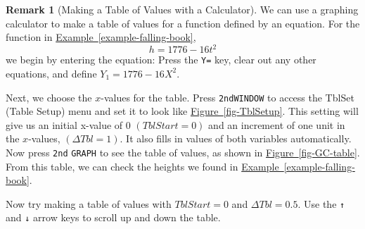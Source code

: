 \documentclass[10pt,]{book}
\theoremstyle{plain}
\theoremstyle{definition}
\newtheorem{remark}[theorem]{Remark}
\theoremstyle{definition}
\theoremstyle{definition}
\newlength{\panelmax}
\begin{document}
\begin{remark}[Making a Table of Values with a Calculator]\label{remark-1}
We can use a graphing calculator to make a table of values for a function defined by an equation. For the function in \hyperref[example-falling-book]{Example~\ref{example-falling-book}},%
\begin{equation*}
h = 1776 - 16t^2
\end{equation*}
we begin by entering the equation: Press the \lstinline?Y=? key, clear out any other equations, and define \(Y_1 = 1776 - 16X^2.\)%
\par
Next, we choose the \(x\)-values for the table. Press \lstinline?2nd?\lstinline?WINDOW? to access the TblSet (Table Setup) menu and set it to look like \hyperref[fig-TblSetup]{Figure~\ref{fig-TblSetup}}. This setting will give us an initial x-value of 0 \((TblStart = 0)\) and an increment of one unit in the \(x\)-values, \((\Delta Tbl = 1)\). It also fills in values of both variables automatically. Now press \lstinline?2nd? \lstinline?GRAPH? to see the table of values, as shown in \hyperref[fig-GC-table]{Figure~\ref{fig-GC-table}}. From this table, we can check the heights we found in \hyperref[example-falling-book]{Example~\ref{example-falling-book}}.%
\par
Now try making a table of values with \(TblStart = 0\) and \(\Delta Tbl = 0.5\). Use the   \lstinline?↑? and \lstinline?↓? arrow keys to scroll up and down the table.%
{%
\setlength{\panelmax}{0pt}
\newsavebox{\panelboxCimage}
\newlength{\phCimage}\setlength{\phCimage}{\ht\panelboxCimage+\dp\panelboxCimage}
\settototalheight{\phCimage}{\usebox{\panelboxCimage}}
\setlength{\panelmax}{\maxof{\panelmax}{\phCimage}}
\newsavebox{\panelboxDimage}
}
\end{remark}
\end{document}
